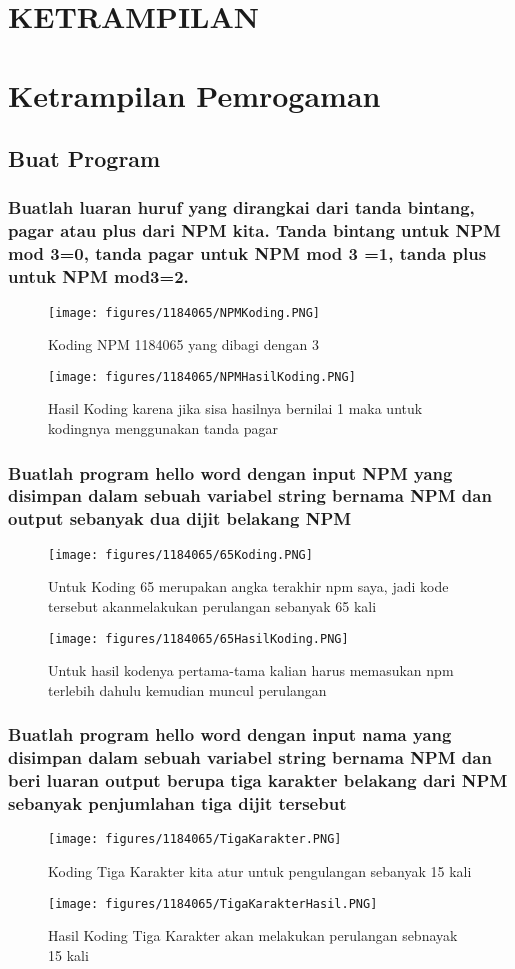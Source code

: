 \section{KETRAMPILAN}

\section{Ketrampilan Pemrogaman}
\subsection{Buat Program}
\subsubsection{Buatlah luaran huruf yang dirangkai dari tanda bintang, pagar atau plus dari NPM kita.
Tanda bintang untuk NPM mod 3=0, tanda pagar untuk NPM mod 3 =1, tanda plus untuk NPM mod3=2.}
\begin{figure}[H]
		\texttt{[image: figures/1184065/NPMKoding.PNG]}
		\centering
		\caption{Koding NPM 1184065 yang dibagi dengan 3}
\end{figure}
\begin{figure}[H]
		\texttt{[image: figures/1184065/NPMHasilKoding.PNG]}
		\centering
		\caption{Hasil Koding karena jika sisa hasilnya bernilai 1 maka untuk kodingnya menggunakan tanda pagar}
\end{figure}
\subsubsection{Buatlah program hello word dengan input NPM yang disimpan dalam sebuah variabel string bernama \textbf{NPM} dan output sebanyak dua dijit belakang NPM}
\begin{figure}[H]
		\texttt{[image: figures/1184065/65Koding.PNG]}
		\centering
		\caption{Untuk Koding 65 merupakan angka terakhir npm saya, jadi kode tersebut akanmelakukan perulangan sebanyak 65 kali}
\end{figure}
\begin{figure}[H]
		\texttt{[image: figures/1184065/65HasilKoding.PNG]}
		\centering
		\caption{Untuk hasil kodenya pertama-tama kalian harus memasukan npm terlebih dahulu kemudian muncul perulangan}
\end{figure}
\subsubsection{Buatlah program hello word dengan input nama yang disimpan dalam sebuah variabel string bernama \textbf{NPM} dan beri luaran output berupa tiga karakter belakang dari NPM sebanyak penjumlahan tiga dijit tersebut}
\begin{figure}[H]
		\texttt{[image: figures/1184065/TigaKarakter.PNG]}
		\centering
		\caption{Koding Tiga Karakter kita atur untuk pengulangan sebanyak 15 kali}
\end{figure}
\begin{figure}[H]
		\texttt{[image: figures/1184065/TigaKarakterHasil.PNG]}
		\centering
		\caption{Hasil Koding Tiga Karakter akan melakukan perulangan sebnayak 15 kali}
\end{figure}
